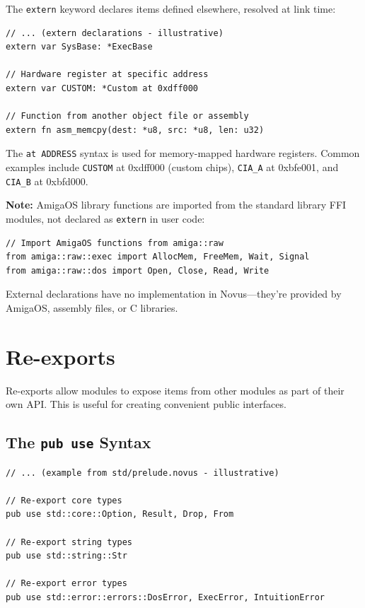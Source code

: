 The \texttt{extern} keyword declares items defined elsewhere, resolved at link time:

\begin{lstlisting}
// ... (extern declarations - illustrative)
extern var SysBase: *ExecBase

// Hardware register at specific address
extern var CUSTOM: *Custom at 0xdff000

// Function from another object file or assembly
extern fn asm_memcpy(dest: *u8, src: *u8, len: u32)
\end{lstlisting}

The \texttt{at ADDRESS} syntax is used for memory-mapped hardware registers. Common examples include \texttt{CUSTOM} at 0xdff000 (custom chips), \texttt{CIA\_A} at 0xbfe001, and \texttt{CIA\_B} at 0xbfd000.

\textbf{Note:} AmigaOS library functions are imported from the standard library FFI modules, not declared as \texttt{extern} in user code:

\begin{lstlisting}
// Import AmigaOS functions from amiga::raw
from amiga::raw::exec import AllocMem, FreeMem, Wait, Signal
from amiga::raw::dos import Open, Close, Read, Write
\end{lstlisting}

External declarations have no implementation in Novus---they're provided by AmigaOS, assembly files, or C libraries.

\section{Re-exports}
\label{sec:reexports}

Re-exports allow modules to expose items from other modules as part of their own API. This is useful for creating convenient public interfaces.

\subsection{The \texttt{pub use} Syntax}
\label{subsec:pub-use}

\begin{lstlisting}
// ... (example from std/prelude.novus - illustrative)

// Re-export core types
pub use std::core::Option, Result, Drop, From

// Re-export string types
pub use std::string::Str

// Re-export error types
pub use std::error::errors::DosError, ExecError, IntuitionError
\end{lstlisting}

